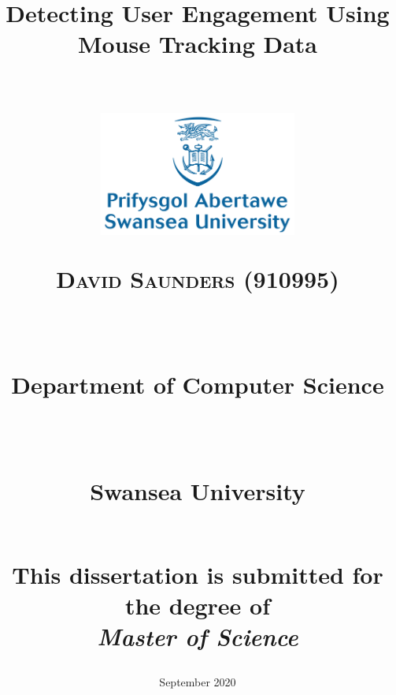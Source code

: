 



\newcommand{\horrule}[1]{\rule{\linewidth}{#1}} %
\title{
\begin{Huge}\textbf{Detecting User Engagement Using Mouse Tracking Data} \end{Huge} \\%
\vspace{70px}
\includegraphics[width = 65mm]{Images/SwanseaUniversity}\\[8ex]
\begin{large} \textsc{\textbf{David Saunders (910995)}} \end{large} \\ %
\vspace{10px}
\normalfont \normalsize 
\begin{normalsize}Department of Computer Science \end{normalsize}\\  %
\begin{normalsize} Swansea University \end{normalsize} \\ %
\vspace{60px}
This dissertation is submitted for the degree of\\
\textit{Master of Science}
\vspace{20px}
}
\date{September 2020} %
\newpage
